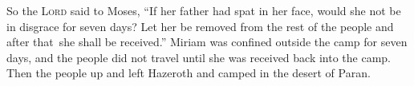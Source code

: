 \begin{inparaenum}
     So the \textsc{Lord} said to Moses, ``If her father had spat in her face, would she not be in disgrace for seven days? Let her be removed from the rest of the people and after that\understood\ she shall be received.''%
     Miriam was confined outside the camp for seven days, and the people did not travel until she was received back into the camp.%
     Then the people up and left Hazeroth and camped in the desert of Paran.%
\end{inparaenum}
